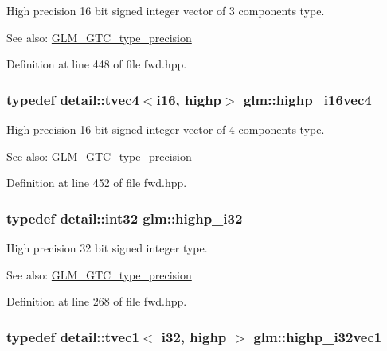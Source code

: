 High precision 16 bit signed integer vector of 3 components type. \begin{Desc}
\item[See also:]\hyperlink{group__gtc__type__precision}{GLM\_\-GTC\_\-type\_\-precision} \end{Desc}


Definition at line 448 of file fwd.hpp.\hypertarget{group__gtc__type__precision_g7fd6f1b3c224833cc330a2c64b6994dd}{
\subsubsection[highp\_\-i16vec4]{\setlength{\rightskip}{0pt plus 5cm}typedef detail::tvec4$<$i16, highp$>$ {\bf glm::highp\_\-i16vec4}}}
\label{group__gtc__type__precision_g7fd6f1b3c224833cc330a2c64b6994dd}


High precision 16 bit signed integer vector of 4 components type. \begin{Desc}
\item[See also:]\hyperlink{group__gtc__type__precision}{GLM\_\-GTC\_\-type\_\-precision} \end{Desc}


Definition at line 452 of file fwd.hpp.\hypertarget{group__gtc__type__precision_g197d19b585222da57d70238a5cfc2be8}{
\subsubsection[highp\_\-i32]{\setlength{\rightskip}{0pt plus 5cm}typedef detail::int32 {\bf glm::highp\_\-i32}}}
\label{group__gtc__type__precision_g197d19b585222da57d70238a5cfc2be8}


High precision 32 bit signed integer type. \begin{Desc}
\item[See also:]\hyperlink{group__gtc__type__precision}{GLM\_\-GTC\_\-type\_\-precision} \end{Desc}


Definition at line 268 of file fwd.hpp.\hypertarget{group__gtc__type__precision_gdcd58130a48fa561e784a135a88c5d6e}{
\subsubsection[highp\_\-i32vec1]{\setlength{\rightskip}{0pt plus 5cm}typedef detail::tvec1$<$ i32, highp $>$ {\bf glm::highp\_\-i32vec1}}}
\label{group__gtc__type__precision_gdcd58130a48fa561e784a135a88c5d6e}



